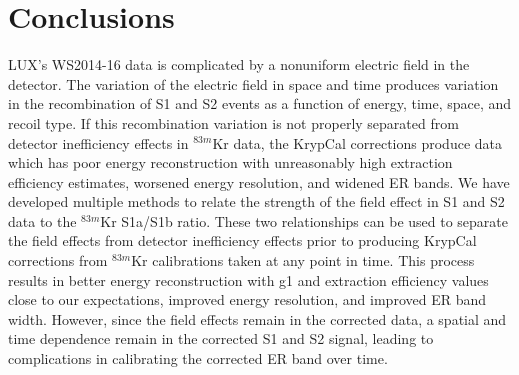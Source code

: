 
\section{Conclusions}

LUX's WS2014-16 data is complicated by a nonuniform electric field in the detector.  The variation of the electric field in space and time produces variation in the recombination of S1 and S2 events as a function of energy, time, space, and recoil type.  If this recombination variation is not properly separated from detector inefficiency effects in $^{83m}$Kr data, the KrypCal corrections produce data which has poor energy reconstruction with unreasonably high extraction efficiency estimates, worsened energy resolution, and widened ER bands.  We have developed multiple methods to relate the strength of the field effect in S1 and S2 data to the $^{83m}$Kr S1a/S1b ratio.  These two relationships can be used to separate the field effects from detector inefficiency effects prior to producing KrypCal corrections from $^{83m}$Kr calibrations taken at any point in time.  This process results in better energy reconstruction with g1 and extraction efficiency values close to our expectations,  improved energy resolution, and improved ER band width.  However, since the field effects remain in the corrected data, a spatial and time dependence remain in the corrected S1 and S2 signal, leading to complications in calibrating the corrected ER band over time.

